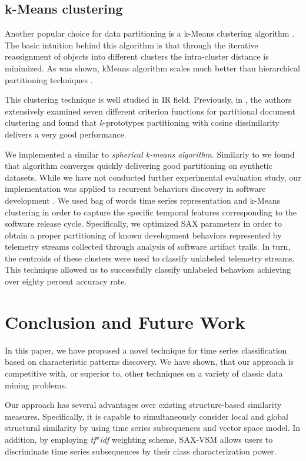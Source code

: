 \documentclass{llncs}
\begin{document}
\subsection{k-Means clustering} \label{trajectory}
Another popular choice for data partitioning is a k-Means clustering algorithm \cite{kmeans}.
The basic intuition behind this algorithm is that through the iterative reassignment of objects 
into different clusters the intra-cluster distance is minimized. As was shown, kMeans 
algorithm scales much better than hierarchical partitioning techniques \cite{kscale}.

This clustering technique is well studied in IR field. Previously, in \cite{zhao}, the authors 
extensively examined seven different criterion functions for partitional document clustering 
and found that \textit{k}-prototypes partitioning with cosine dissimilarity delivers a very good 
performance. 

We implemented a similar to \cite{modha} \textit{spherical k-means algorithm}. Similarly to
\cite{bag_patterns} we found that algorithm converges quickly delivering good partitioning
on synthetic datasets. While we have not conducted further experimental evaluation study, 
our implementation was applied to recurrent  behaviors discovery in software development 
\cite{android}. We used bag of words time series representation and k-Means clustering in
order to capture the specific temporal features corresponding to the software release cycle.
Specifically, we optimized SAX parameters in order to obtain a proper partitioning of known 
development behaviors represented by telemetry streams collected through analysis of 
software artifact trails. In turn, the centroids of these clusters were used to classify unlabeled 
telemetry streams. This technique allowed us to successfully classify unlabeled behaviors 
achieving over eighty percent accuracy rate.

\section{Conclusion and Future Work}
In this paper, we have proposed a novel technique for time series classification based on 
characteristic patterns discovery. We have shown, that our approach is competitive with, 
or superior to, other techniques on a variety of classic data mining problems. 

Our approach has several advantages over existing structure-based similarity measures.
Specifically, it is capable to simultaneously consider local and global structural similarity by 
using time series subsequences and vector space model. In addition, by employing
\textit{tf$\ast$idf} weighting scheme, SAX-VSM allows users to discriminate time series
subsequences by their class characterization power.
\end{document}
